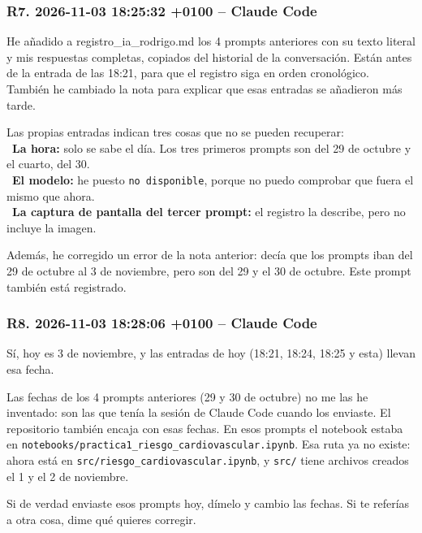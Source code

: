 \documentclass[11pt,a4paper]{article}
\begin{document}
\subsubsection*{R7. 2026-11-03 18:25:32 +0100 -- Claude Code}
{\small
He añadido a registro\_\allowbreak{}ia\_\allowbreak{}rodrigo.md los 4 prompts anteriores con su texto literal y mis respuestas completas, copiados del historial de la conversación. Están antes de la entrada de las 18:21, para que el registro siga en orden cronológico. También he cambiado la nota para explicar que esas entradas se añadieron más tarde.

Las propias entradas indican tres cosas que no se pueden recuperar: \\{}
\hspace*{1.0em}\textbullet~\textbf{La hora:} solo se sabe el día. Los tres primeros prompts son del 29 de octubre y el cuarto, del 30. \\{}
\hspace*{1.0em}\textbullet~\textbf{El modelo:} he puesto \texttt{no disponible}, porque no puedo comprobar que fuera el mismo que ahora. \\{}
\hspace*{1.0em}\textbullet~\textbf{La captura de pantalla del tercer prompt:} el registro la describe, pero no incluye la imagen.

Además, he corregido un error de la nota anterior: decía que los prompts iban del 29 de octubre al 3 de noviembre, pero son del 29 y el 30 de octubre. Este prompt también está registrado.

}

\subsubsection*{R8. 2026-11-03 18:28:06 +0100 -- Claude Code}
{\small
Sí, hoy es 3 de noviembre, y las entradas de hoy (18:21, 18:24, 18:25 y esta) llevan esa fecha.

Las fechas de los 4 prompts anteriores (29 y 30 de octubre) no me las he inventado: son las que tenía la sesión de Claude Code cuando los enviaste. El repositorio también encaja con esas fechas. En esos prompts el notebook estaba en \texttt{notebooks/\allowbreak{}practica1\_\allowbreak{}riesgo\_\allowbreak{}cardiovascular.ipynb}. Esa ruta ya no existe: ahora está en \texttt{src/\allowbreak{}riesgo\_\allowbreak{}cardiovascular.ipynb}, y \texttt{src/\allowbreak{}} tiene archivos creados el 1 y el 2 de noviembre.

Si de verdad enviaste esos prompts hoy, dímelo y cambio las fechas. Si te referías a otra cosa, dime qué quieres corregir.

}
\end{document}
